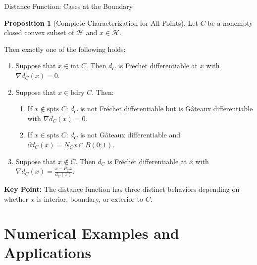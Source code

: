 \documentclass[aspectratio=169,10pt]{beamer}
\theoremstyle{definition}
\newtheorem{proposition}{Proposition}
\begin{document}
\begin{frame}{Distance Function: Cases at the Boundary}

\begin{proposition}[Complete Characterization for All Points]
Let $C$ be a nonempty closed convex subset of $\mathcal{H}$ and $x \in \mathcal{H}$.

Then exactly one of the following holds:

\begin{enumerate}
  \item[(i)] Suppose that $x \in \text{int } C$. Then $d_C$ is Fréchet differentiable
            at $x$ with $\nabla d_C(x) = 0$.

  \item[(ii)] Suppose that $x \in \text{bdry } C$. Then:
    \begin{enumerate}
      \item[(a)] If $x \notin \text{spts } C$: $d_C$ is not Fréchet differentiable but
                is Gâteaux differentiable with $\nabla d_C(x) = 0$.

      \item[(b)] If $x \in \text{spts } C$: $d_C$ is not Gâteaux differentiable
                and $\partial d_C(x) = N_C x \cap B(0;1)$.
    \end{enumerate}

  \item[(iii)] Suppose that $x \notin C$. Then $d_C$ is Fréchet differentiable at $x$
              with $\nabla d_C(x) = \frac{x - P_C x}{d_C(x)}$.
\end{enumerate}
\end{proposition}

\vspace{0.2cm}

\textbf{Key Point:} The distance function has three distinct behaviors depending on
whether $x$ is interior, boundary, or exterior to $C$.

\end{frame}


\section{Numerical Examples and Applications}
\end{document}
